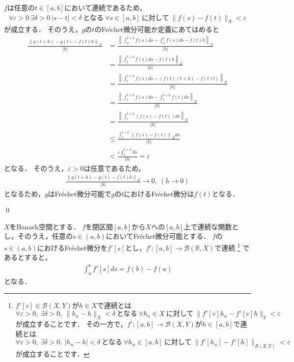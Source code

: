 \begin{Proof}
$f$は任意の$t \in [a, b]$において連続であるため，
\begin{align*}
	\forall \varepsilon > 0 ~ \exists \delta > 0 ~ | s - t | < \delta ~ \mbox{となる} ~ \forall s \in [a, b] ~ \mbox{に対して} ~ \| f(s) - f(t) \|_{X} < \varepsilon
\end{align*}
が成立する．
そのうえ，$g$の$t$のFr\'echet微分可能か定義にあてはめると
\begin{align*}
	\frac{ \left\| g(t + h) - g(t) - f(t)h \right\|_{X} }{ |h| } &= \frac{ \left\| \int_{a}^{t+h} f(s) ds - \int_{a}^{t} f(s) ds - f(t)h \right\|_{X} }{ |h| } \\
	&= \frac{ \left\| \int_{t}^{t+h} f(s) ds - f(t)h \right\|_{X} }{ |h| } \\
	&= \frac{ \left\| \int_{t}^{t+h} f(s) ds - \left( f(t)( t+h) - f(t)t \right) \right\|_{X} }{ |h| } \\
	&= \frac{ \left\| \int_{t}^{t+h} f(s) ds - \int_{t}^{t+h} f(t) ds \right\|_{X} }{ |h| } \\
	&= \frac{ \left\| \int_{t}^{t+h} \left( f(s)  - f(t) \right) ds \right\|_{X} }{ |h| } \\
	&\le \frac{ \int_{t}^{t+h} \left\| f(s)  - f(t) \right\|_{X} ds }{ |h| } \\
	&< \frac{ \varepsilon   \int_{t}^{t+h}  ds }{ |h| } = \varepsilon 
\end{align*}
となる．
そのうえ，$\varepsilon > 0$は任意であるため，
\begin{align*}
	\frac{ \left\| g(t + h) - g(t) - f(t)h \right\|_{X} }{ |h| } \rightarrow 0, ~ (h \rightarrow 0)
\end{align*}
となるため，$g$はFr\'echet微分可能で$g$の$t$におけるFr\'echet微分は$f(t)$となる．

\qed
\end{Proof}


\begin{Thm}[Fr\'echet微分と閉区間上におけるBochner積分に対する微分積分学の基本定理(ii)]\label{thm:fund_theorem_ii}
$X$をBanach空間とする．
$f$を閉区間$[a, b]$から$X$への$[a,b]$上で連続な関数とし，そのうえ，任意の$s \in (a, b) $においてFr\'echet微分可能とする．
$f$の$s \in (a, b)$におけるFr\'echet微分を$f'[s]$とし，$f': [a, b] \rightarrow {\mathcal B}({\mathbb R},X)$で連続
\footnote{ 
$f'[v] \in {\mathcal B}(X, Y)$が$h \in X$で連続とは
\[
	\forall \varepsilon > 0, ~ \exists \delta > 0, ~ \| h_n - h \|_X < \delta ~ \mbox{となる} ~ \forall h_n \in X ~ \mbox{に対して} ~ \| f'[v] h_n - f'[v] h \|_{Y} < \varepsilon
\]
が成立することです．
その一方で，$f' : [a, b] \rightarrow {\mathcal B}(X, Y)$が$h \in [a,b]$で連続とは
\[
	\forall \varepsilon > 0, ~ \exists \delta > 0, ~ | h_n - h | < \delta ~ \mbox{となる} ~ \forall h_n \in [a,b] ~ \mbox{に対して} ~ \| f'[h_n] - f'[h]  \|_{{\mathcal B}(X,Y)} < \varepsilon
\]
が成立することです．
}
であるとすると，
\begin{align*}
	\int_{a}^{b} f'[s] ds = f(b) - f(a)
\end{align*}
となる．
\end{Thm}


